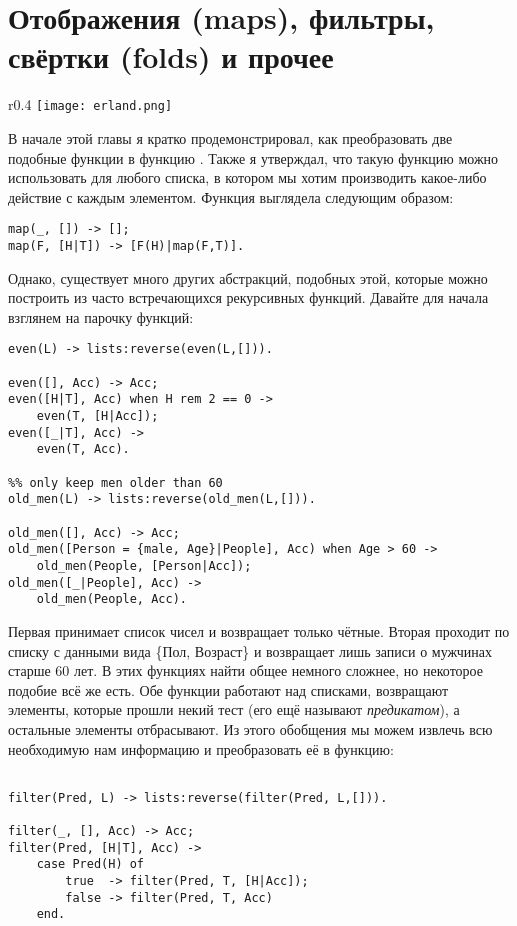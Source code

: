 \section{Отображения (maps), фильтры, свёртки (folds) и прочее}
\label{maps-filters-folds-and-more}
\begin{wrapfigure}{r}{0.4\linewidth}
    \texttt{[image: erland.png]}
\end{wrapfigure}
В начале этой главы я кратко продемонстрировал, как преобразовать две подобные функции в функцию . Также я утверждал, что такую функцию можно использовать для любого списка, в котором мы хотим производить какое\--либо действие с каждым элементом. Функция выглядела следующим образом:
\begin{lstlisting}[style=erlang]
map(_, []) -> [];
map(F, [H|T]) -> [F(H)|map(F,T)].
\end{lstlisting}
Однако, существует много других абстракций, подобных этой, которые можно построить из часто встречающихся рекурсивных функций. Давайте для начала взглянем на парочку функций:
\begin{lstlisting}[style=erlang]
%% only keep even numbers
even(L) -> lists:reverse(even(L,[])).
 
even([], Acc) -> Acc;
even([H|T], Acc) when H rem 2 == 0 ->
    even(T, [H|Acc]);
even([_|T], Acc) ->
    even(T, Acc).
 
%% only keep men older than 60
old_men(L) -> lists:reverse(old_men(L,[])).
 
old_men([], Acc) -> Acc;
old_men([Person = {male, Age}|People], Acc) when Age > 60 ->
    old_men(People, [Person|Acc]);
old_men([_|People], Acc) ->
    old_men(People, Acc).
\end{lstlisting}

Первая принимает список чисел и возвращает только чётные. Вторая проходит по списку с данными вида \{Пол, Возраст\} и возвращает лишь записи о мужчинах старше 60 лет. В этих функциях найти общее немного сложнее, но некоторое подобие всё же есть. Обе функции работают над списками, возвращают элементы, которые прошли некий тест (его ещё называют \emph{предикатом}), а остальные элементы отбрасывают. Из этого обобщения мы можем извлечь всю необходимую нам информацию и преобразовать её в функцию:
\begin{lstlisting}[style=erlang]

filter(Pred, L) -> lists:reverse(filter(Pred, L,[])).
 
filter(_, [], Acc) -> Acc;
filter(Pred, [H|T], Acc) ->
    case Pred(H) of
        true  -> filter(Pred, T, [H|Acc]);
        false -> filter(Pred, T, Acc)
    end.
\end{lstlisting}

